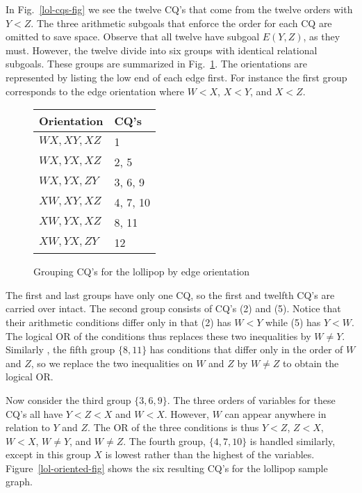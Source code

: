 \begin{example}
\label{lol-ex}
In Fig.~\ref{lol-cqs-fig} we see the twelve CQ's that come from the twelve orders with $Y<Z$.
The three arithmetic subgoals that enforce the order for each CQ are omitted to save space.
Observe that all twelve have subgoal $E(Y,Z)$, as they must.  However, the twelve divide into six groups with identical relational subgoals.  These groups are summarized in Fig.~\ref{lol-groups-fig}.  The orientations are represented by listing the low end of each edge first.  For instance the first group corresponds to the edge orientation where $W<X$, $X<Y$, and $X<Z$.

\begin{figure}[htfb]

\begin{center}
\begin{tabular}{l l}
Orientation & CQ's\\
\hline
$WX,XY,XZ$ & 1\\
$WX,YX,XZ$ & 2, 5\\
$WX,YX,ZY$ & 3, 6, 9\\
$XW,XY,XZ$ & 4, 7, 10\\
$XW,YX,XZ$ & 8, 11\\
$XW,YX,ZY$ & 12\\
\end{tabular}
\end{center}

\caption{Grouping CQ's for the lollipop by edge orientation}
\label{lol-groups-fig}

\end{figure}

The first and last groups have only one CQ, so the first and twelfth CQ's are carried over intact.
The second group consists of CQ's (2) and (5).  Notice that their arithmetic conditions differ only in that (2) has $W<Y$ while (5) has $Y<W$.  The logical OR of the conditions thus replaces these two inequalities by $W\ne Y$.   Similarly , the fifth group $\{8,11\}$ has conditions that differ only in the order of $W$ and $Z$, so we replace the two inequalities on $W$ and $Z$ by $W\ne Z$ to obtain the logical OR.

Now consider the third group $\{3,6,9\}$.  The three orders of variables for these CQ's all have $Y<Z<X$ and $W<X$.  However, $W$ can appear anywhere in relation to $Y$ and $Z$.  The OR of the three conditions is thus $Y<Z$, $Z<X$, $W<X$, $W\ne Y$, and $W\ne Z$.  The fourth group, $\{4,7,10\}$ is handled similarly, except in this group $X$ is lowest rather than the highest of the variables.  Figure~\ref{lol-oriented-fig} shows the six resulting CQ's for the lollipop sample graph.
\end{example}

